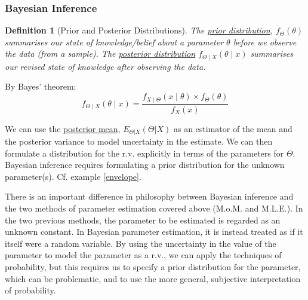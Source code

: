 \documentclass[12pt,a4paper]{article}
\newtheorem{defn}[thm]{Definition}
\begin{document}
\subsubsection{Bayesian Inference}

\begin{defn}[Prior and Posterior Distributions]\vspace{1cm}

The \underline{prior distribution}, $f_\Theta(\theta)$ summarises our state of knowledge/belief about a parameter $\theta$ before we observe the data (from a sample). The \underline{posterior distribution} $f_{\Theta \mid X}(\theta \mid x)$ summarises our revised state of knowledge after observing the data.

\end{defn}

By Bayes' theorem:
$$f_{\Theta \mid X}(\theta\mid x) = \frac{f_{X\mid\Theta}(x\mid \theta) \times f_{\Theta}(\theta)}{f_X(x)}$$

We can use the \underline{posterior mean}, $E_{\Theta|X}(\Theta | X)$ as an estimator of the mean and the posterior variance to model uncertainty in the estimate. We can then formulate a distribution for the r.v. explicitly in terms of the parameters for $\Theta$. Bayesian inference requires formulating a prior distribution for the unknown parameter(s). Cf. example \ref{envelope}.

There is an important difference in philosophy between Bayesian inference and the two methods of parameter estimation covered above (M.o.M. and M.L.E.). In the two previous methods, the parameter to be estimated is regarded as an unknown constant. In Bayesian parameter estimation, it is instead treated as if it itself were a random variable. By using the uncertainty in the value of the parameter to model the parameter as a r.v., we can apply the techniques of probability, but this requires us to specify a prior distribution for the parameter, which can be problematic, and to use the more general, subjective interpretation of probability.
\end{document}
